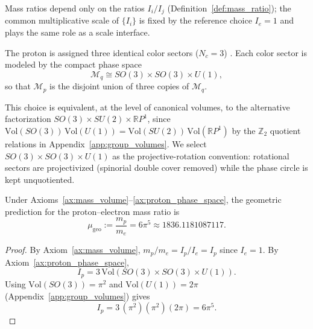 \begin{remark}\label{rem:mass_normalization_gauge}
Mass ratios depend only on the ratios $I_i/I_j$ (Definition~\ref{def:mass_ratio}); the common multiplicative scale of $\{I_i\}$ is fixed by the reference choice $I_e=1$ and plays the same role as a scale interface.
\end{remark}

\begin{axiom}\label{ax:proton_phase_space}
The proton is assigned three identical color sectors ($N_c=3$) \cite{PeskinSchroeder1995,PDGRPP2024}. Each color sector is modeled by the compact phase space
\begin{equation}
\mathcal{M}_{q}\cong SO(3)\times SO(3)\times U(1),
\end{equation}
so that $\mathcal{M}_p$ is the disjoint union of three copies of $\mathcal{M}_q$.

This choice is equivalent, at the level of canonical volumes, to the alternative factorization $SO(3)\times SU(2)\times \mathbb{R}P^1$, since $\mathrm{Vol}(SO(3))\,\mathrm{Vol}(U(1))=\mathrm{Vol}(SU(2))\,\mathrm{Vol}(\mathbb{R}P^1)$ by the $\mathbb{Z}_2$ quotient relations in Appendix~\ref{app:group_volumes}. We select $SO(3)\times SO(3)\times U(1)$ as the projective-rotation convention: rotational sectors are projectivized (spinorial double cover removed) while the phase circle is kept unquotiented.
\end{axiom}

\begin{theorem}\label{thm:mu_geo}
Under Axioms~\ref{ax:mass_volume}--\ref{ax:proton_phase_space}, the geometric prediction for the proton--electron mass ratio is
\begin{equation}
\mu_{\mathrm{geo}}:=\frac{m_p}{m_e}=6\pi^5\approx 1836.1181087117.
\end{equation}
\end{theorem}
\begin{proof}
By Axiom~\ref{ax:mass_volume}, $m_p/m_e=I_p/I_e=I_p$ since $I_e=1$. By Axiom~\ref{ax:proton_phase_space},
\begin{equation}
I_p=3\,\mathrm{Vol}(SO(3)\times SO(3)\times U(1)).
\end{equation}
Using $\mathrm{Vol}(SO(3))=\pi^2$ and $\mathrm{Vol}(U(1))=2\pi$ (Appendix~\ref{app:group_volumes}) gives
\begin{equation}
I_p=3\,(\pi^2)(\pi^2)(2\pi)=6\pi^5.
\end{equation}
\end{proof}

